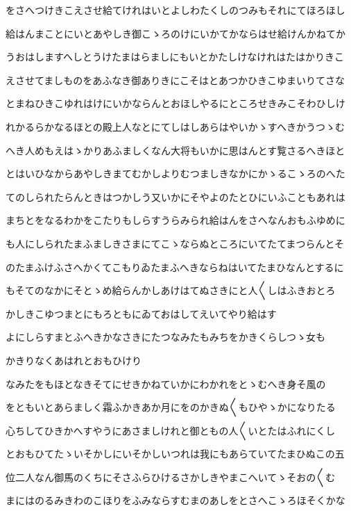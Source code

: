 \documentclass[a4paper,11pt,landscape]{ltjtarticle}
\begin{document}
\par\medskip
をさへつけきこえさせ給てけれはいとよしわたくしのつみもそれにてほろほし
\par\medskip
給はんまことにいとあやしき御こゝろのけにいかてかならはせ給けんかねてか
\par\medskip
うおはしますへしとうけたまはらましにもいとかたしけなけれはたはかりきこ
\par\medskip
えさせてましものをあふなき御ありきにこそはとあつかひきこゆまいりてさな
\par\medskip
とまねひきこゆれはけにいかならんとおほしやるにところせきみこそわひしけ
\par\medskip
れかるらかなるほとの殿上人なとにてしはしあらはやいかゝすへきかうつゝむ
\par\medskip
へき人めもえはゝかりあふましくなん大将もいかに思はんとす覧さるへきほと
\par\medskip
とはいひなからあやしきまてむかしよりむつましきなかにかゝるこゝろのへた
\par\medskip
てのしられたらんときはつかしう又いかにそやよのたとひにいふこともあれは
\par\medskip
まちとをなるわかをこたりもしらすうらみられ給はんをさへなんおもふゆめに
\par\medskip
も人にしられたまふましきさまにてこゝならぬところにいてたてまつらんとそ
\par\medskip
のたまふけふさへかくてこもりゐたまふへきならねはいてたまひなんとするに
\par\medskip
もそてのなかにそとゝめ給らんかしあけはてぬさきにと人〱しはふきおとろ
\par\medskip
かしきこゆつまとにもろともにゐておはしてえいてやり給はす
\par\medskip
よにしらすまとふへきかなさきにたつなみたもみちをかきくらしつゝ女も
\par\medskip
かきりなくあはれとおもひけり
\par\medskip
なみたをもほとなきそてにせきかねていかにわかれをとゝむへき身そ風の
\par\medskip
をともいとあらましく霜ふかきあか月にをのかきぬ〱もひやゝかになりたる
\par\medskip
心ちしてひきかへすやうにあさましけれと御ともの人〱いとたはふれにくし
\par\medskip
とおもひてたゝいそかしにいそかしいつれは我にもあらていてたまひぬこの五
\par\medskip
位二人なん御馬のくちにそさふらひけるさかしきやまこへいてゝそおの〱む
\par\medskip
まにはのるみきわのこほりをふみならすむまのあしをとさへこゝろほそくかな
\end{document}
